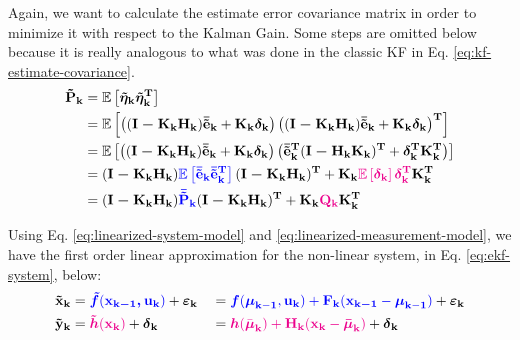 \documentclass[12pt]{article}
\newcommand{\bvec}[1]{\boldsymbol{\mathbf{#1}}} %
\newcommand{\bvecT}[1]{\boldsymbol{\mathbf{#1^T}}} %
\newcommand{\mat}[1]{\boldsymbol{\mathbf{#1}}}
\newcommand{\matT}[1]{\boldsymbol{\mathbf{#1^T}}}
\newcommand{\brac}[1]{\left[#1\right]} %
\newcommand{\parentheses}[1]{\left(#1\right)}
\newcommand{\mb}[1]{{\boldsymbol{#1}}} %
\newcommand{\expv}[1]{\mathbb{E}\brac{#1}} %
\newcommand{\blue}[1]{\color{blue}#1\color{black}}
\newcommand{\magenta}[1]{\color{magenta}#1\color{black}}
\begin{document}
Again, we want to calculate the estimate error covariance matrix in 
order to minimize it with respect to the Kalman Gain. Some steps are
omitted below because it is really analogous to what was done in the
classic KF in Eq. \ref{eq:kf-estimate-covariance}.
\begin{equation}
\begin{aligned}
    \mat{\tilde{P}_k} &= \expv{\bvec{\tilde{\eta}_k} 
        \bvecT{\tilde{\eta}_k}}\\
    &= \expv{\parentheses{(\mat{I - K_k H_k})\bvec{\bar{\tilde{e}}_k}
    + \mat{K_k}\bvec{\delta_k}} \parentheses{(\mat{I - K_k H_k})
    \bvec{\bar{\tilde{e}}_k} 
    + \mat{K_k}\bvec{\delta_k}}^\mathbf{T}}\\
    &= \expv{\parentheses{(\mat{I - K_k H_k})\bvec{\bar{\tilde{e}}_k}
    + \mat{K_k}\bvec{\delta_k}} \parentheses{\bvecT{\bar{\tilde{e}}_k}
    (\mat{I - H_k K_k})^\mathbf{T} 
    + \bvecT{\delta_k}\matT{K_k}}}\\
    &= (\mat{I - K_k H_k})\blue{\expv{\bvec{\bar{\tilde{e}}_k} 
    \bvecT{\bar{\tilde{e}}_k}}}(\mat{I - K_k H_k})^\mathbf{T} 
    + \mat{K_k}\magenta{\expv{\bvec{\delta_k}} \bvecT{\delta_k}}\matT{K_k}\\
    &= (\mat{I - K_k H_k})\blue{\mat{\bar{\tilde{P}}_k}}(\mat{I - K_k H_k})^\mathbf{T} 
    + \mat{K_k}\magenta{\mat{Q_k}}\matT{K_k}
\end{aligned}
\label{eq:ekf-estimate-error-covariance}
\end{equation}

Using Eq. \ref{eq:linearized-system-model} and \ref{eq:linearized-measurement-model}, we have the first order linear approximation for the non-linear system, in Eq. \ref{eq:ekf-system}, below:
\begin{equation}
    \begin{aligned}
        \bvec{\tilde{x}_k} &= \blue{\mb{\tilde{f}}(\bvec{x_{k-1}, u_k})} + \mb{\varepsilon}_\mathbf{k} &&= \blue{\mb{f}(\mb{\mu}_\mathbf{k-1}, \bvec{u_k}) + \mat{F_k} (\bvec{x_{k-1}} - \mb{\mu}_\mathbf{k-1})} + \mb{\varepsilon}_\mathbf{k}\\
        \bvec{\tilde{y}_k} &= \magenta{\mb{\tilde{h}}(\bvec{x_k})} + \mb{\delta}_\mathbf{k} &&= \magenta{\mb{h}(\bar{\mb{\mu}}_\mathbf{k}) + \mat{H_k} (\bvec{x_k} - \mb{\bar{\mu}}_\mathbf{k})} + \mb{\delta}_\mathbf{k}\\
    \end{aligned}
    \label{eq:ekf-linearized-system}
\end{equation}
\end{document}
